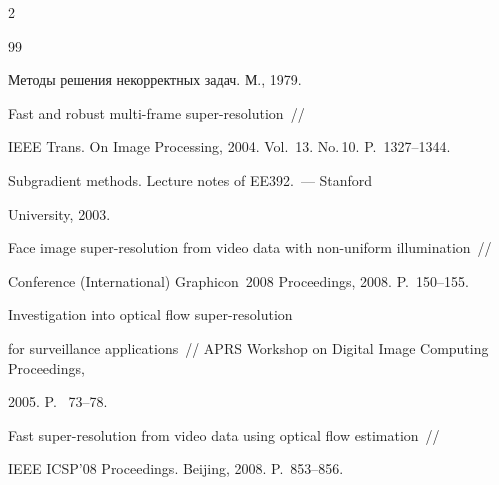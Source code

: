 \begin{multicols}{2}
{{\begin{thebibliography}{99}




Методы решения некорректных задач. М., 1979.









Fast and robust multi-frame super-resolution~// 


IEEE Trans. On Image Processing, 2004. Vol.~13. No.\,10. P.~1327--1344.









Subgradient methods. Lecture notes of EE392.~--- Stanford 


University, 2003.









Face image super-resolution from video data with non-uniform illumination~//


Conference (International) Graphicon~2008 Proceedings, 2008. P.~150--155.









Investigation into optical flow super-resolution 


for surveillance applications~// APRS Workshop on Digital Image Computing Proceedings, 


2005. P.~ 73--78.









Fast super-resolution from video data using optical flow estimation~// 


IEEE ICSP'08 Proceedings. Beijing, 2008. P.~853--856.










\end{thebibliography}}}
\end{multicols}
